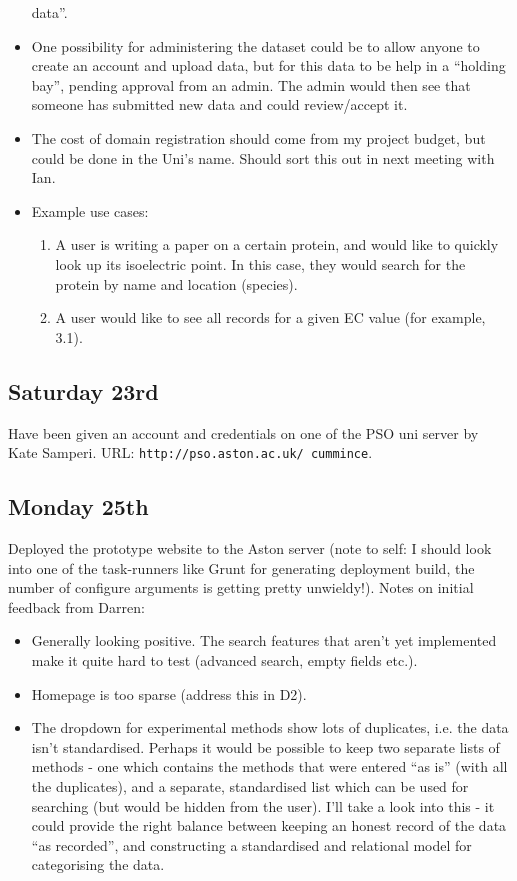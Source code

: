 \begin{itemize}
  data''.
\item One possibility for administering the dataset could be to allow anyone to
  create an account and upload data, but for this data to be help in a ``holding
  bay'', pending approval from an admin. The admin would then see that someone
  has submitted new data and could review/accept it.
\item The cost of domain registration should come from my project budget, but
  could be done in the Uni's name. Should sort this out in next meeting with
  Ian.
\item Example use cases:
  \begin{enumerate}
    \item A user is writing a paper on a certain protein, and would like to
      quickly look up its isoelectric point. In this case, they would search for
      the protein by name and location (species).
    \item A user would like to see all records for a given EC value (for
      example, 3.1).
  \end{enumerate}
\end{itemize}

\subsection{Saturday 23rd}
Have been given an account and credentials on one of the PSO uni server by Kate
Samperi. URL: \texttt{http://pso.aston.ac.uk/~cummince}.

\subsection{Monday 25th}
Deployed the prototype website to the Aston server (note to self: I should look
into one of the task-runners like Grunt for generating deployment build, the
number of configure arguments is getting pretty unwieldy!). Notes on initial
feedback from Darren:

\begin{itemize}
\item Generally looking positive. The search features that aren't yet
  implemented make it quite hard to test (advanced search, empty fields etc.).
\item Homepage is too sparse (address this in D2).
\item The dropdown for experimental methods show lots of duplicates, i.e. the
  data isn't standardised.  Perhaps it would be possible to keep two separate
  lists of methods - one which contains the methods that were entered ``as is''
  (with all the duplicates), and a separate, standardised list which can be used
  for searching (but would be hidden from the user). I'll take a look into this
  - it could provide the right balance between keeping an honest record of the
  data ``as recorded'', and constructing a standardised and relational model for
  categorising the data.
\end{itemize}

